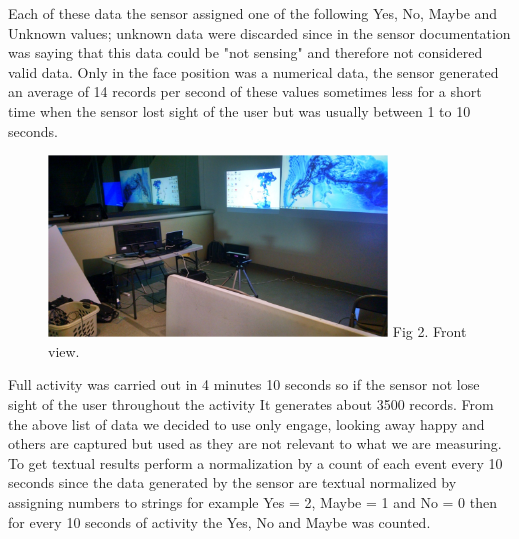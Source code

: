 \documentclass[journal]{IEEEtran}
\begin{document}
Each of these data the sensor assigned one of the following Yes, No, Maybe and Unknown values; unknown data were discarded since in the sensor documentation was saying that this data could be "not sensing" and therefore not considered valid data. Only in the face position was a numerical data, the sensor generated an average of 14 records per second of these values sometimes less for a short time when the sensor lost sight of the user  but was usually between 1 to 10 seconds. 


\begin{figure}[H]
	\centering
	\includegraphics [width=90mm]{tromp2.PNG}
	\label{fig:Figure 2}
	Fig 2. Front view.
\end{figure}

Full activity was carried out in 4 minutes 10 seconds so if the sensor not lose sight of the user throughout the activity It generates about 3500 records. From the above list of data we decided to use only engage, looking away happy and others are captured but used as they are not relevant to what we are measuring. To get textual results perform a normalization by a count of each event every 10 seconds since the data generated by the sensor are textual normalized by assigning numbers to strings for example Yes = 2, Maybe = 1 and No = 0 then for every 10 seconds of activity the Yes, No and Maybe was counted.
\end{document}
